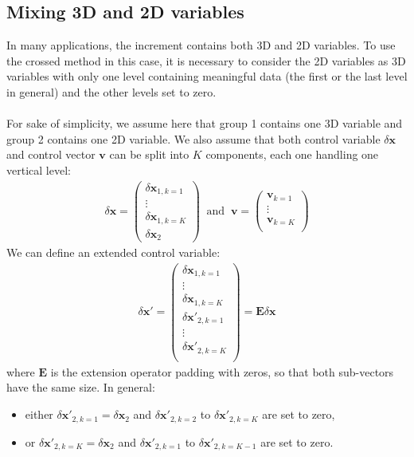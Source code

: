 \documentclass[12pt]{scrartcl}
\begin{document}
\subsection{Mixing 3D and 2D variables}
In many applications, the increment contains both 3D and 2D variables. To use the crossed method in this case, it is necessary to consider the 2D variables as 3D variables with only one level containing meaningful data (the first or the last level in general) and the other levels set to zero.\\
$  $\\
For sake of simplicity, we assume here that group 1 contains one 3D variable and group 2 contains one 2D variable. We also assume that both control variable $\delta \mathbf{x}$ and control vector $\mathbf{v}$ can be split into $K$ components, each one handling one vertical level:
\begin{align}
\delta \mathbf{x} = \left( \begin{array}{c}
\delta \mathbf{x}_{1,k=1} \\[1ex]
\vdots \\
\delta \mathbf{x}_{1,k=K} \\[1ex]
\hline
\delta \mathbf{x}_{2}
\end{array} \right) \ \text{ and } \ \mathbf{v} = \left( \begin{array}{c}
\mathbf{v}_{k=1} \\[1ex]
\vdots \\
\mathbf{v}_{k=K} \\[1ex]
\end{array} \right)
\end{align}
We can define an extended control variable:
\begin{align}
\delta \mathbf{x}' = \left( \begin{array}{c}
\delta \mathbf{x}_{1,k=1} \\[1ex]
\vdots \\
\delta \mathbf{x}_{1,k=K} \\[1ex]
\hline
\delta \mathbf{x}'_{2,k=1} \\[1ex]
\vdots \\
\delta \mathbf{x}'_{2,k=K} \\[1ex]
\end{array} \right) = \mathbf{E} \delta \mathbf{x}
\end{align}
where $\mathbf{E}$ is the extension operator padding with zeros, so that both sub-vectors have the same size. In general:
\begin{itemize}
\item either $\delta \mathbf{x}'_{2,k=1} = \delta \mathbf{x}_2$ and 
$\delta \mathbf{x}'_{2,k=2}$ to $\delta \mathbf{x}'_{2,k=K}$ are set to zero,
\item or $\delta \mathbf{x}'_{2,k=K} = \delta \mathbf{x}_2$ and 
$\delta \mathbf{x}'_{2,k=1}$ to $\delta \mathbf{x}'_{2,k=K-1}$ are set to zero.
\end{itemize}
\end{document}
